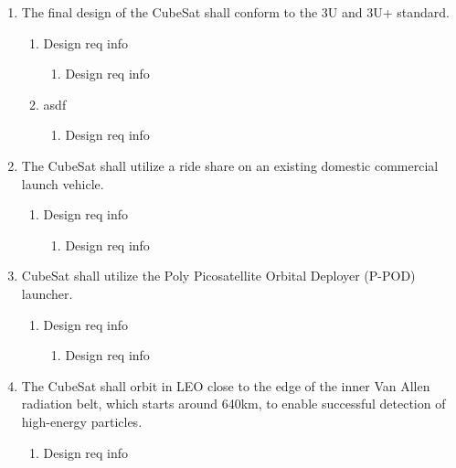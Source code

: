 \documentclass[3p]{elsarticle}
\begin{document}
\renewcommand{\labelenumi}{\theenumi}
\renewcommand{\labelenumii}{\theenumii}
\renewcommand{\labelenumiii}{\theenumiii}
\renewcommand{\theenumi}{\textbf{FR.\arabic{enumi}}}
\renewcommand{\theenumii}{\textbf{DR.\arabic{enumi}.\arabic{enumii}}}
\renewcommand{\theenumiii}{\textbf{DR.\arabic{enumi}.\arabic{enumii}.\arabic{enumiii}}}
\begin{enumerate}
    \item The final design of the CubeSat shall conform to the 3U and 3U+ standard.
    \begin{enumerate}
        \item Design req info
        \begin{enumerate}
            \item Design req info
        \end{enumerate}
        \item asdf
        \begin{enumerate}
            \item Design req info
        \end{enumerate}
    \end{enumerate}
    \item The CubeSat shall utilize a ride share on an existing domestic commercial launch vehicle.
    \begin{enumerate}
        \item Design req info
        \begin{enumerate}
            \item Design req info
        \end{enumerate}
    \end{enumerate}
    \item CubeSat shall utilize the Poly Picosatellite Orbital Deployer (P-POD) launcher.
    \begin{enumerate}
        \item Design req info
        \begin{enumerate}
            \item Design req info
        \end{enumerate}
    \end{enumerate}
    \item The CubeSat shall orbit in LEO close to the edge of the inner Van Allen radiation belt, which starts around 640km, to enable successful detection of high-energy particles.
    \begin{enumerate}
        \item Design req info

\end{enumerate}
\end{enumerate}
\end{document}

